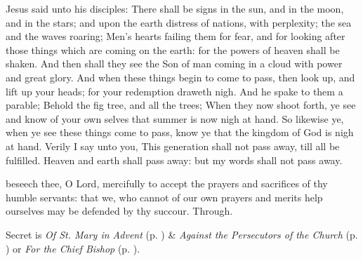 

\vspace{-1ex}

 Jesus said unto his disciples: There shall be signs in the sun, and in the moon, and in the stars; and upon the earth distress of nations, with perplexity; the sea and the waves roaring; Men's hearts failing them for fear, and for looking after those things which are coming on the earth: for the powers of heaven shall be shaken. And then shall they see the Son of man coming in a cloud with power and great glory. And when these things begin to come to pass, then look up, and lift up your heads; for your redemption draweth nigh. And he spake to them a parable; Behold the fig tree, and all the trees; When they now shoot forth, ye see and know of your own selves that summer is now nigh at hand. So likewise ye, when ye see these things come to pass, know ye that the kingdom of God is nigh at hand. Verily I say unto you, This generation shall not pass away, till all be fulfilled. Heaven and earth shall pass away: but my words shall not pass away.

\secret
{} beseech thee, O Lord, mercifully to accept the prayers and sacrifices of thy humble servants: that we, who cannot of our own prayers and merits help ourselves may be defended by thy succour. Through.
\begin{rubric}
     Secret is \emph{Of St. Mary in Advent} (p. \pageref{SPMaryInAdvent}) \&  \emph{Against the Persecutors of the Church} (p. \pageref{SPAgainst}) or \emph{For the Chief Bishop} (p. \pageref{SPChiefBishop}).
\end{rubric}

\vspace{-1ex}


\vspace{-1ex}

